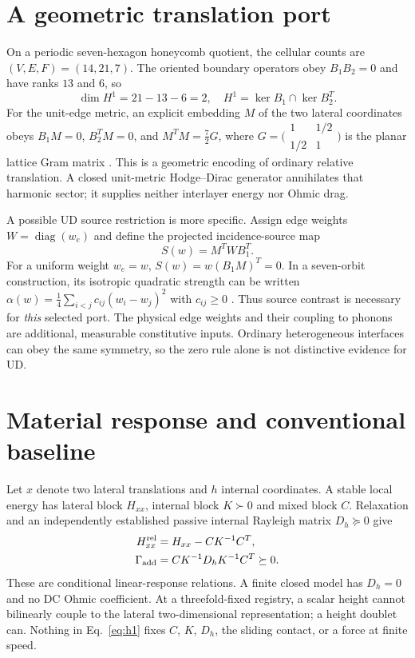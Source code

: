 \documentclass[9pt,a4paper,twocolumn]{extarticle}
\begin{document}
\section{A geometric translation port}
On a periodic seven-hexagon honeycomb quotient, the cellular counts are $(V,E,F)=(14,21,7)$. The oriented boundary operators obey $B_1B_2=0$ and have ranks $13$ and $6$, so
\begin{equation}
 \dim H^1=21-13-6=2,\quad H^1=\ker B_1\cap\ker B_2^T. \label{eq:h1}
\end{equation}
For the unit-edge metric, an explicit embedding $M$ of the two lateral coordinates obeys $B_1M=0$, $B_2^TM=0$, and $M^TM=\frac72G$, where $G=\bigl(\begin{smallmatrix}1&1/2\\1/2&1\end{smallmatrix}\bigr)$ is the planar lattice Gram matrix \cite{udrecord}. This is a geometric encoding of ordinary relative translation. A closed unit-metric Hodge--Dirac generator annihilates that harmonic sector; it supplies neither interlayer energy nor Ohmic drag.

A possible UD source restriction is more specific. Assign edge weights $W=\operatorname{diag}(w_e)$ and define the projected incidence-source map
\begin{equation}
 S(w)=M^TWB_1^T. \label{eq:source}
\end{equation}
For a uniform weight $w_e=w$, $S(w)=w(B_1M)^T=0$. In a seven-orbit construction, its isotropic quadratic strength can be written $\alpha(w)=\frac14\sum_{i<j}c_{ij}(w_i-w_j)^2$ with $c_{ij}\geq0$ \cite{udrecord}. Thus source contrast is necessary for \emph{this} selected port. The physical edge weights and their coupling to phonons are additional, measurable constitutive inputs. Ordinary heterogeneous interfaces can obey the same symmetry, so the zero rule alone is not distinctive evidence for UD.

\section{Material response and conventional baseline}
Let $x$ denote two lateral translations and $h$ internal coordinates. A stable local energy has lateral block $H_{xx}$, internal block $K\succ0$ and mixed block $C$. Relaxation and an independently established passive internal Rayleigh matrix $D_h\succeq0$ give
\begin{align}
 H_{xx}^{\rm rel}&=H_{xx}-CK^{-1}C^T,\label{eq:schur}\\
 \Gamma_{\rm add}&=CK^{-1}D_hK^{-1}C^T\succeq0.\label{eq:gamma}
\end{align}
These are conditional linear-response relations. A finite closed model has $D_h=0$ and no DC Ohmic coefficient. At a threefold-fixed registry, a scalar height cannot bilinearly couple to the lateral two-dimensional representation; a height doublet can. Nothing in Eq.~\eqref{eq:h1} fixes $C$, $K$, $D_h$, the sliding contact, or a force at finite speed.
\end{document}
